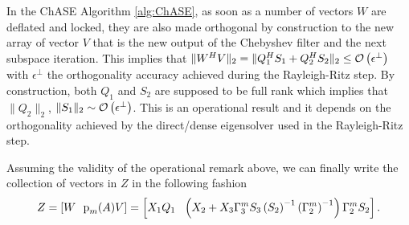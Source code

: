\begin{remark}
\label{rm:QS}
In the ChASE Algorithm \ref{alg:ChASE}, as soon as a number of vectors $W$ are deflated and locked, they are also made orthogonal by construction to the new array of vector $V$ that is the new output of the Chebyshev filter and the next subspace iteration. This implies that $\|W^H V\|_2 = \|Q_1^H S_1 + Q_2^H S_2\|_2 \leq \mathcal{O}\left( \epsilon^\bot \right)$ with $\epsilon^\bot$ the orthogonality accuracy achieved during the Rayleigh-Ritz step. By construction, both $Q_1$ and $S_2$ are supposed to be full rank which implies that $\|Q_2\|_2$, $\|S_1\|_2 \sim \mathcal{O}\left( \epsilon^\bot \right)$. This is an operational result and it depends on the orthogonality achieved by the direct/dense eigensolver used in the Rayleigh-Ritz step.
\end{remark}
Assuming the validity of the operational remark above, we can finally write the collection of vectors in $Z$ in the following fashion
\begin{equation}
\label{eq:ZMat}
    Z = [W\ \ {\textrm p}_{m} (A) V] = \left[ X_1 Q_1\ \ \left(X_2 + X_3 \Gamma_3^m S_3 \left(S_2\right)^{-1} \left(\Gamma_2^m\right)^{-1}\right)\Gamma_2^m S_2 \right].
\end{equation}

